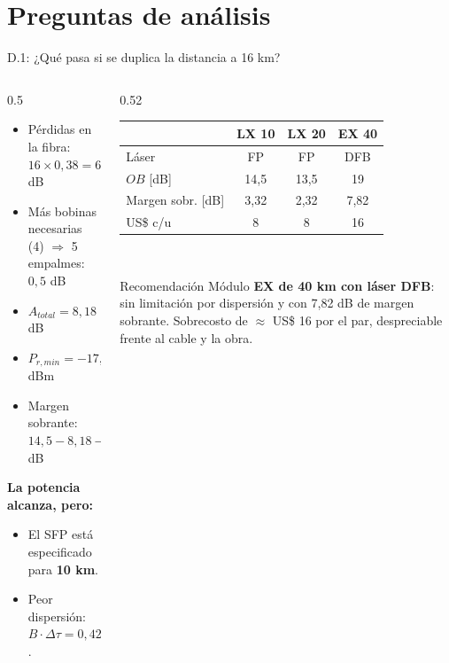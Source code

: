\documentclass[aspectratio=1610]{beamer}
\begin{document}
\section[Análisis]{Preguntas de análisis}
\begin{frame}{D.1: ¿Qué pasa si se duplica la distancia a 16 km?}
  \begin{columns}[T]
    \begin{column}{0.5\textwidth}
      \begin{itemize}
        \item Pérdidas en la fibra:\\ $16 \times 0{,}38 = 6{,}08$ dB
        \item Más bobinas necesarias (4) $\Rightarrow$ 5 empalmes: $0{,}5$ dB
        \item $A_{total} = 8{,}18$ dB 
        \item $P_{r,min} = -17{,}68$ dBm
        \item Margen sobrante:\\ $14{,}5 - 8{,}18 - 3 = 3{,}32$ dB
      \end{itemize}
      \vspace{0.1cm}
      \textbf{La potencia alcanza, pero:}
      \begin{itemize}
        \item El SFP está especificado para \textbf{10 km}.
        \item Peor dispersión:\\ $B \cdot \Delta\tau = 0{,}42 > 0{,}25$.
      \end{itemize}
    \end{column}
    \begin{column}{0.52\textwidth}
      \small
      \setlength{\tabcolsep}{4pt}
      \begin{tabular}{lccc}
        \toprule
        & \textbf{LX 10} & \textbf{LX 20} & \textbf{EX 40} \\
        \midrule
        Láser & FP & FP & DFB \\
        $OB$ [dB] & 14,5 & 13,5 & 19 \\
        Margen sobr. [dB] & 3,32 & 2,32 & 7,82 \\
        US\$ c/u & 8 & 8 & 16 \\
        \bottomrule
      \end{tabular}\\[0.2cm]
      \normalsize
      \begin{block}{Recomendación}
        Módulo \textbf{EX de 40 km con láser DFB}: sin limitación por dispersión y con 7,82 dB de margen sobrante. Sobrecosto de $\approx$ US\$ 16 por el par, despreciable frente al cable y la obra.
      \end{block}
    \end{column}
  \end{columns}
\end{frame}
\end{document}
